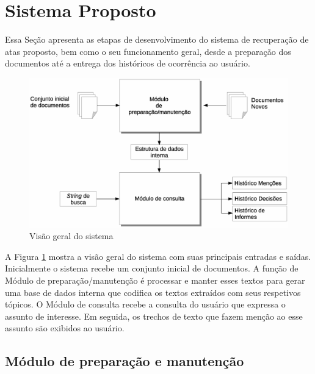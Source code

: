 \section{Sistema Proposto}
\label{sec:sistema-proposto}

Essa Seção apresenta as etapas de desenvolvimento do sistema de recuperação de atas proposto, bem como o seu funcionamento geral, desde a preparação dos documentos até a entrega dos históricos de ocorrência ao usuário. 


  \begin{figure}[!h]
	  \centering
	  \includegraphics[width=0.69\paperwidth]{conteudo/capitulos/figs/visao-geral-3.eps}
	  \caption{Visão geral do sistema}
	  \label{fig:visao-geral}
  \end{figure}


A Figura \ref{fig:visao-geral} mostra a visão geral do sistema com suas principais entradas e saídas. Inicialmente o sistema recebe um conjunto inicial de documentos. A função de Módulo de preparação/manutenção é processar e manter esses textos para gerar uma base de dados interna que codifica os textos extraídos com seus respetivos tópicos. O Módulo de consulta recebe a consulta do usuário que expressa o assunto de interesse. Em seguida, os trechos de texto que fazem menção ao esse assunto são exibidos ao usuário.









\subsection{Módulo de preparação e manutenção}\label{sec:modulo-preparacao}

